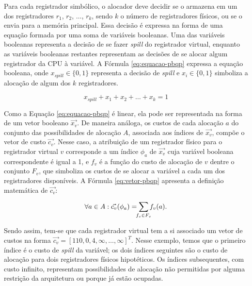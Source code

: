 \documentclass[
	12pt,				%
	openright,			%
	oneside,			%
	a4paper,			%
	tccpreliminar,			%
	]{ABNT-DC-UEL}
\begin{document}
Para cada registrador simbólico, o alocador deve decidir se o armazena em um dos registradores $r_1$, $r_2$, $\ldots$, $r_k$, sendo $k$ o número de registradores físicos, ou se o envia para a memória principal. Essa decisão é expressa na forma de uma equação formada por uma soma de variáveis booleanas. Uma das variáveis booleanas representa a decisão de se fazer \textit{spill} do registrador virtual, enquanto as variáveis booleanas restantes representam as decisões de se alocar algum registrador da CPU à variável. A Fórmula \ref{eq:equacao-pbqp} expressa a equação booleana, onde $x_{\textit{spill}}\in \{0,1\}$ representa a decisão de \textit{spill} e $x_{i}\in \{0,1\}$ simboliza a alocação de algum dos $k$ registradores.

\begin{equation}
    x_{\textit{spill}} + x_{1} + x_{2} + \ldots + x_{k} = 1
    \label{eq:equacao-pbqp}
\end{equation}

Como a Equação \ref{eq:equacao-pbqp} é linear, ela pode ser representada na forma de um vetor booleano $\Vec{x_v}$. De maneira análoga, os custos de cada alocação $a$ do conjunto das possibilidades de alocação $A$, associada aos índices de $\Vec{x_v}$, compõe o vetor de custo $\Vec{c_v}$. Nesse caso, a atribuição de um registrador físico para o registrador virtual $v$ corresponde a um índice $\phi_a$ de $\Vec{x_v}$ cuja variável booleana correspondente é igual a 1, e $f_v$ é a função do custo de alocação de $v$ dentre o conjunto $F_v$, que simboliza os custos de se alocar a variável a cada um dos registradores disponíveis. A Fórmula \ref{eq:vetor-pbqp} apresenta a definição matemática de $\Vec{c_v}$:

\begin{equation}
    \forall a \in A : \Vec{c_v}({\phi}_a)=\sum_{\mathclap{f_v \in F_v}}f_v(a).
    \label{eq:vetor-pbqp}
\end{equation}

Sendo assim, tem-se que cada registrador virtual tem a si associado um vetor de custos na forma $\Vec{c_v} = [110, 0, 4, \infty, \ldots, \infty]^T$. Nesse exemplo, temos que o primeiro índice é o custo de \textit{spill} da variável; os dois índices seguintes são o custo de alocação para dois registradores físicos hipotéticos. Os índices subsequentes, com custo infinito, representam possibilidades de alocação não permitidas por alguma restrição da arquitetura ou porque já estão ocupadas.
\end{document}
